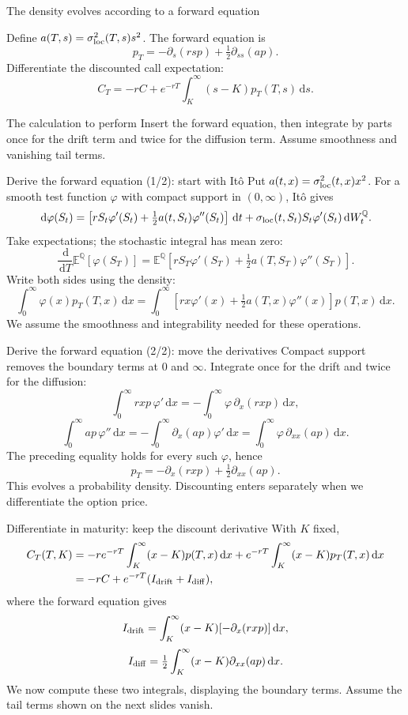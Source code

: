 \documentclass[handout,10pt,t,aspectratio=169]{beamer}
\newcommand{\E}{\mathbb E}
\newcommand{\Q}{\mathbb Q}
\newcommand{\dd}{\,\mathrm d}
\begin{document}
\begin{frame}{The density evolves according to a forward equation}

    Define \(a(T,s)=\sigma_{\rm loc}^2(T,s)s^2\). The forward equation is
    \[p_T=-\partial_s(rsp)+\tfrac12\partial_{ss}(ap).\]
    Differentiate the discounted call expectation:
    \[C_T=-rC+e^{-rT}\int_K^\infty(s-K)p_T(T,s)\dd s.\]
    \begin{block}{The calculation to perform}
    Insert the forward equation, then integrate by parts once for the drift
    term and twice for the diffusion term. Assume smoothness and vanishing tail terms.
    \end{block}
\end{frame}

\begin{frame}{Derive the forward equation (1/2): start with It\^o}
\small
Put \(a(t,x)=\sigma_{\rm loc}^2(t,x)x^2\). For a smooth test function
\(\varphi\) with compact support in \((0,\infty)\), It\^o gives
\[
\dd\varphi(S_t)=\left[rS_t\varphi'(S_t)
+\tfrac12 a(t,S_t)\varphi''(S_t)\right]\dd t
+\sigma_{\rm loc}(t,S_t)S_t\varphi'(S_t)\dd W_t^\Q.
\]
Take expectations; the stochastic integral has mean zero:
\[
\frac{\dd}{\dd T}\E^\Q[\varphi(S_T)]
=\E^\Q\!\left[rS_T\varphi'(S_T)
+\tfrac12 a(T,S_T)\varphi''(S_T)\right].
\]
Write both sides using the density:
\[
\boxed{\int_0^\infty\varphi(x)p_T(T,x)\dd x
=\int_0^\infty\left[rx\varphi'(x)+\tfrac12a(T,x)\varphi''(x)\right]p(T,x)\dd x.}
\]
We assume the smoothness and integrability needed for these operations.
\end{frame}

\begin{frame}{Derive the forward equation (2/2): move the derivatives}
\small
Compact support removes the boundary terms at \(0\) and \(\infty\).
Integrate once for the drift and twice for the diffusion:
\[
\int_0^\infty rxp\,\varphi'\dd x
=-\int_0^\infty\varphi\,\partial_x(rxp)\dd x,
\]
\[
\int_0^\infty ap\,\varphi''\dd x
=-\int_0^\infty\partial_x(ap)\varphi'\dd x
=\int_0^\infty\varphi\,\partial_{xx}(ap)\dd x.
\]
The preceding equality holds for every such \(\varphi\), hence
\[
\boxed{p_T=-\partial_x(rxp)+\tfrac12\partial_{xx}(ap).}
\]
This evolves a probability density. Discounting enters separately when we
differentiate the option price.
\end{frame}

\begin{frame}{Differentiate in maturity: keep the discount derivative}
\small
With \(K\) fixed,
\[
\begin{aligned}
C_T(T,K)
&=-r e^{-rT}\int_K^\infty(x-K)p(T,x)\dd x
+e^{-rT}\int_K^\infty(x-K)p_T(T,x)\dd x\\
&=-rC+e^{-rT}(I_{\rm drift}+I_{\rm diff}),
\end{aligned}
\]
where the forward equation gives
\[
I_{\rm drift}=\int_K^\infty(x-K)[-\partial_x(rxp)]\dd x,
\]
\[
I_{\rm diff}=\tfrac12\int_K^\infty(x-K)\partial_{xx}(ap)\dd x.
\]
We now compute these two integrals, displaying the boundary terms.
Assume the tail terms shown on the next slides vanish.
\end{frame}
\end{document}
